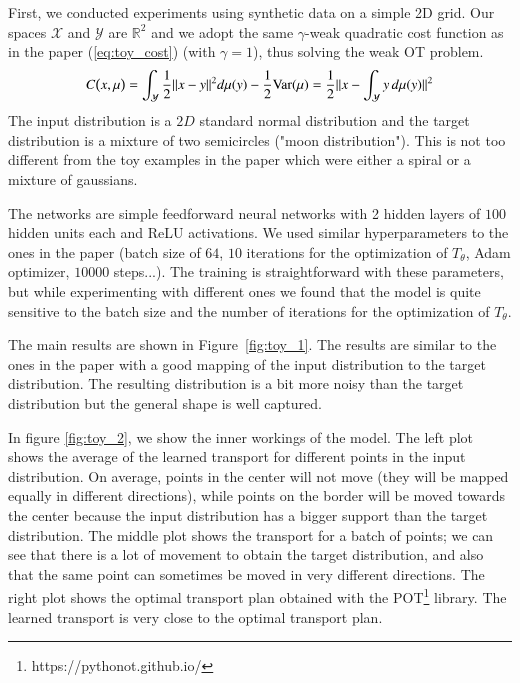 \documentclass[11pt]{article}
\newcommand{\R}{\mathbb{R}}
\begin{document}
First, we conducted experiments using synthetic data on a simple 2D grid. Our spaces $\mathcal{X}$ and $\mathcal{Y}$ are $\R^2$ and we adopt the same $\gamma$-weak quadratic cost function as in the paper (\ref{eq:toy_cost}) (with $\gamma=1$), thus solving the weak OT problem.
\begin{equation}
    C\big{(}x,\mu\big{)}=\int_{\mathcal{Y}}\frac{1}{2}\|x-y\|^{2}d\mu(y)-\frac{1}{2} \text{Var}(\mu)=\frac{1}{2}\|x-\int_{\mathcal{Y}}y\,d\mu(y)\|^{2}
    \label{eq:toy_cost}
\end{equation}
The input distribution is a $2D$ standard normal distribution and the target distribution is a mixture of two semicircles ("moon distribution"). This is not too different from the toy examples in the paper which were either a spiral or a mixture of gaussians.

The networks are simple feedforward neural networks with 2 hidden layers of $100$ hidden units each and ReLU activations. We used similar hyperparameters to the ones in the paper (batch size of $64$, $10$ iterations for the optimization of $T_\theta$, Adam optimizer, $10000$ steps...). The training is straightforward with these parameters, but while experimenting with different ones we found that the model is quite sensitive to the batch size and the number of iterations for the optimization of $T_\theta$.

The main results are shown in Figure~\ref{fig:toy_1}. The results are similar to the ones in the paper with a good mapping of the input distribution to the target distribution. The resulting distribution is a bit more noisy than the target distribution but the general shape is well captured.

In figure \ref{fig:toy_2}, we show the inner workings of the model. The left plot shows the average of the learned transport for different points in the input distribution. On average, points in the center will not move (they will be mapped equally in different directions), while points on the border will be moved towards the center because the input distribution has a bigger support than the target distribution. The middle plot shows the transport for a batch of points; we can see that there is a lot of movement to obtain the target distribution, and also that the same point can sometimes be moved in very different directions. The right plot shows the optimal transport plan obtained with the POT\footnote{https://pythonot.github.io/} library. The learned transport is very close to the optimal transport plan.
\end{document}
